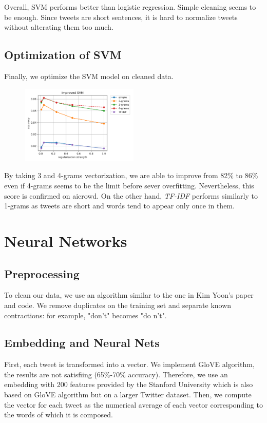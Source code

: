 \documentclass[11pt, a4paper, twocolumn]{article}
\begin{document}
Overall, SVM performs better than logistic regression. Simple cleaning seems to be enough. Since tweets are short sentences, it is hard to normalize tweets without alterating them too much.

\subsection{Optimization of SVM}
Finally, we optimize the SVM model on cleaned data.

\begin{figure}[h]
	\includegraphics[width=0.5\textwidth]{../plots/improved_svm.png}
\end{figure}

By taking 3 and 4-grams vectorization, we are able to improve from 82\% to 86\% even if 4-grams seems to be the limit before sever overfitting. Nevertheless, this score is confirmed on aicrowd. On the other hand, \textit{TF-IDF} performs similarly to 1-grams as tweets are short and words tend to appear only once in them.

\section{Neural Networks}

\subsection{Preprocessing}
To clean our data, we use an algorithm similar to the one in Kim Yoon's paper\cite{kimyoonpaper} and code\cite{kimyooncode}. We remove duplicates on the training set and separate known contractions: for example, "don't" becomes "do n't".

\subsection{Embedding and Neural Nets}
First, each tweet is transformed into a vector. We implement
GloVE algorithm, the results are not satisfiing (65\%-70\% accuracy). Therefore, we use an embedding with 200 features
provided by the Stanford University which is also based on GloVE algorithm but on a larger Twitter dataset\cite{glovepaper, gloveembedding}. 
Then, we compute the vector for each tweet as the numerical average of each vector corresponding to the 
words of which it is composed.
\end{document}
